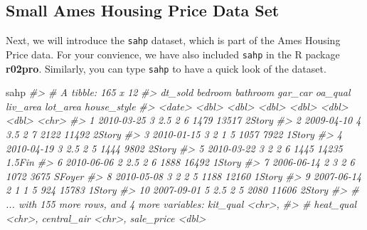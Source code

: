 \documentclass[
]{book}
\newenvironment{Shaded}{\begin{snugshade}}{\end{snugshade}}
\newcommand{\CommentTok}[1]{\textcolor[rgb]{0.56,0.35,0.01}{\textit{#1}}}
\newcommand{\NormalTok}[1]{#1}
\begin{document}
\hypertarget{sahp}{%
\subsection{Small Ames Housing Price Data Set}\label{sahp}}

Next, we will introduce the \texttt{sahp} dataset, which is part of the Ames Housing Price data. For your convience, we have also included \texttt{sahp} in the R package \textbf{r02pro}. Similarly, you can type \texttt{sahp} to have a quick look of the dataset.

\begin{Shaded}
\begin{Highlighting}[]
\NormalTok{sahp}
\CommentTok{\#\textgreater{} \# A tibble: 165 x 12}
\CommentTok{\#\textgreater{}    dt\_sold    bedroom bathroom gar\_car oa\_qual liv\_area lot\_area house\_style}
\CommentTok{\#\textgreater{}    \textless{}date\textgreater{}       \textless{}dbl\textgreater{}    \textless{}dbl\textgreater{}   \textless{}dbl\textgreater{}   \textless{}dbl\textgreater{}    \textless{}dbl\textgreater{}    \textless{}dbl\textgreater{} \textless{}chr\textgreater{}      }
\CommentTok{\#\textgreater{}  1 2010{-}03{-}25       3      2.5       2       6     1479    13517 2Story     }
\CommentTok{\#\textgreater{}  2 2009{-}04{-}10       4      3.5       2       7     2122    11492 2Story     }
\CommentTok{\#\textgreater{}  3 2010{-}01{-}15       3      2         1       5     1057     7922 1Story     }
\CommentTok{\#\textgreater{}  4 2010{-}04{-}19       3      2.5       2       5     1444     9802 2Story     }
\CommentTok{\#\textgreater{}  5 2010{-}03{-}22       3      2         2       6     1445    14235 1.5Fin     }
\CommentTok{\#\textgreater{}  6 2010{-}06{-}06       2      2.5       2       6     1888    16492 1Story     }
\CommentTok{\#\textgreater{}  7 2006{-}06{-}14       2      3         2       6     1072     3675 SFoyer     }
\CommentTok{\#\textgreater{}  8 2010{-}05{-}08       3      2         2       5     1188    12160 1Story     }
\CommentTok{\#\textgreater{}  9 2007{-}06{-}14       2      1         1       5      924    15783 1Story     }
\CommentTok{\#\textgreater{} 10 2007{-}09{-}01       5      2.5       2       5     2080    11606 2Story     }
\CommentTok{\#\textgreater{} \# ... with 155 more rows, and 4 more variables: kit\_qual \textless{}chr\textgreater{},}
\CommentTok{\#\textgreater{} \#   heat\_qual \textless{}chr\textgreater{}, central\_air \textless{}chr\textgreater{}, sale\_price \textless{}dbl\textgreater{}}
\end{Highlighting}
\end{Shaded}
\end{document}
